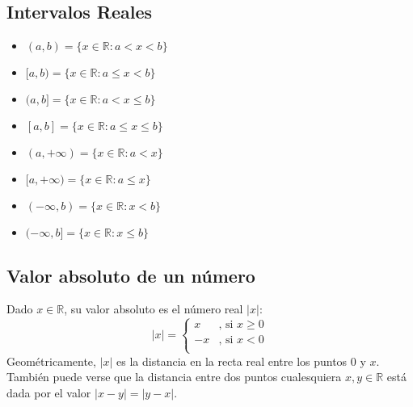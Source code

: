 \documentclass[11pt,a4paper]{article}
\begin{document}
\subsection{Intervalos Reales}
\begin{multicols}{2}
\begin{itemize}
\item $(a,b) = \{ x \in \mathbb{R} : a < x < b \}$
\item $[a,b) = \{ x \in \mathbb{R} : a \leq x < b \}$
\item $(a,b] = \{ x \in \mathbb{R} : a < x \leq b \}$
\item $[a,b] = \{ x \in \mathbb{R} : a \leq x \leq b \}$

\item $(a,+\infty) = \{ x \in \mathbb{R} : a < x \}$
\item $[a,+\infty) = \{ x \in \mathbb{R} : a \leq x \}$
\item $(-\infty,b) = \{ x \in \mathbb{R} : x < b \}$
\item $(-\infty,b] = \{ x \in \mathbb{R} : x \leq b \}$
\end{itemize}
\end{multicols}

\subsection{Valor absoluto de un n\'umero}
Dado $x \in \mathbb{R}$, su valor absoluto es el n\'umero real $|x| : $
\[|x| = \left\{
\begin{array}{ll}
x  & \text{, si } x \geq 0\\
-x & \text{, si } x < 0\\
\end{array} \right.
\]
Geom\'etricamente, $|x|$ es la distancia en la recta real entre los puntos $0$ y $x$. Tambi\'en puede verse que la distancia entre dos puntos cualesquiera $x,y \in \mathbb{R}$ est\'a dada por el valor $|x - y| = |y - x|$.\\
\end{document}
